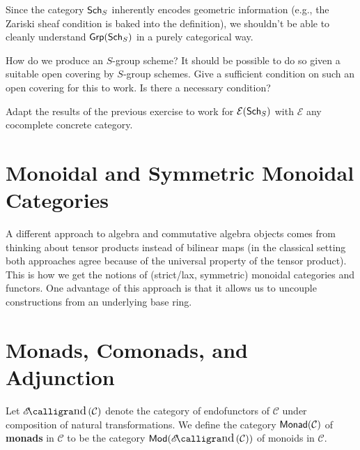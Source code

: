 \documentclass[11pt]{article}
\renewcommand{\C}{\mathcal{C}}
\newcommand{\EE}{\mathcal{E}}
\begin{document}
Since the category $\operatorname{\mathsf{Sch}}_S$ inherently encodes geometric information (e.g., the Zariski sheaf condition is baked into the definition), we shouldn't be able to cleanly understand $\operatorname{\mathsf{Grp}}(\operatorname{\mathsf{Sch}}_S)$ in a purely categorical way. 

\begin{exercise}
How do we produce an $S$-group scheme? It should be possible to do so given a suitable open covering by $S$-group schemes. Give a sufficient condition on such an open covering for this to work. Is there a necessary condition?
\end{exercise}

\begin{exercise}
Adapt the results of the previous exercise to work for $\EE(\Sch_S)$ with $\EE$ any cocomplete concrete category.
\end{exercise}

\section{Monoidal and Symmetric Monoidal Categories}
A different approach to algebra and commutative algebra objects comes from thinking about tensor products instead of bilinear maps (in the classical setting both approaches agree because of the universal property of the tensor product). This is how we get the notions of (strict/lax, symmetric) monoidal categories and functors. One advantage of this approach is that it allows us to uncouple constructions from an underlying base ring.

\section{Monads, Comonads, and Adjunction}
Let $\EEnd(\C)$ denote the category of endofunctors of $\C$ under composition of natural transformations. We define the category $\Monad(\C)$ of \textbf{monads} in $\C$ to be the category $\Mod(\EEnd(\C))$ of monoids in $\C$.
\end{document}
